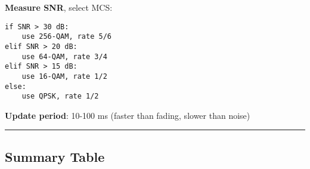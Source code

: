 \textbf{Measure SNR}, select MCS:

\begin{verbatim}
if SNR > 30 dB:
    use 256-QAM, rate 5/6
elif SNR > 20 dB:
    use 64-QAM, rate 3/4
elif SNR > 15 dB:
    use 16-QAM, rate 1/2
else:
    use QPSK, rate 1/2
\end{verbatim}

\textbf{Update period}: 10-100 ms (faster than fading, slower than
noise)

\begin{center}\rule{0.5\linewidth}{0.5pt}\end{center}

\subsection{Summary Table}\label{summary-table}

